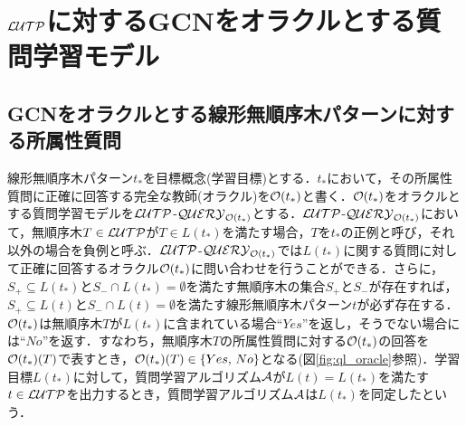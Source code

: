 \section{${\cal LUTP}$に対するGCNをオラクルとする質問学習モデル}%




\subsection{GCNをオラクルとする線形無順序木パターンに対する所属性質問}
線形無順序木パターン$t_*$を目標概念(学習目標)とする．$t_*$において，その所属性質問に正確に回答する完全な教師(オラクル)を${\cal O}(t_{\ast})$と書く．${\cal O}(t_*)$をオラクルとする質問学習モデルを${\cal LUTP}$-${\cal QUERY}_{{\cal O}(t_{\ast})}$とする．${\cal LUTP}$-${\cal QUERY}_{{\cal O}(t_{\ast})}$において，無順序木$T\in{\cal LUTP}$が$T\in L(t_{\ast})$を満たす場合，$T$を$t_{\ast}$の正例と呼び，それ以外の場合を負例と呼ぶ．${\cal LUTP}$-${\cal QUERY}_{{\cal O}(t_{\ast})}$では$L(t_*)$に関する質問に対して正確に回答するオラクル${\cal O}(t_{\ast})$に問い合わせを行うことができる．さらに，$S_{+}\subseteq L(t_{\ast})$と$S_{-}\cap L(t_{\ast})=\emptyset$を満たす無順序木の集合$S_+$と$S_-$が存在すれば，$S_{+}\subseteq L(t)$と$S_{-}\cap L(t)=\emptyset$を満たす線形無順序木パターン$t$が必ず存在する．${\cal O}(t_{\ast})$は無順序木$T$が$L(t_{\ast})$に含まれている場合``$Yes$''を返し，そうでない場合には``$No$''を返す．すなわち，無順序木$T$の所属性質問に対する${\cal O}(t_{\ast})$の回答を${\cal O}(t_{\ast})(T)$で表すとき，${\cal O}(t_{\ast})(T)\in\{Yes,\,No\}$となる(図\ref{fig:ql_oracle}参照)．学習目標$L(t_*)$に対して，質問学習アルゴリズム${\cal A}$が$L(t)=L(t_*)$を満たす$t\in {\cal LUTP}$を出力するとき，質問学習アルゴリズム${\cal A}$は$L(t_*)$を同定したという．

